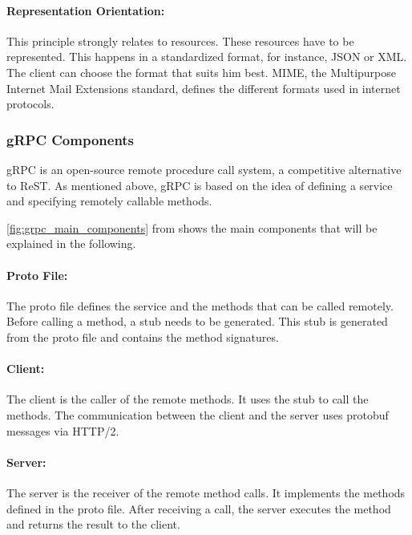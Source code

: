\paragraph*{Representation Orientation:}
This principle strongly relates to resources.
These resources have to be represented.
This happens in a standardized format, for instance, JSON or XML.
The client can choose the format that suits him best.
MIME, the Multipurpose Internet Mail Extensions standard, defines the different formats used in internet protocols.

\subsubsection*{gRPC Components}
gRPC is an open-source remote procedure call system, a competitive alternative to ReST.
As mentioned above, gRPC is based on the idea of defining a service and specifying remotely callable methods.

\autoref{fig:grpc_main_components} from \cite{CM-T-DES} shows the main components that will be explained in the following.

\paragraph*{Proto File:}
The proto file defines the service and the methods that can be called remotely.
Before calling a method, a stub needs to be generated.
This stub is generated from the proto file and contains the method signatures.

\paragraph*{Client:}
The client is the caller of the remote methods.
It uses the stub to call the methods.
The communication between the client and the server uses protobuf messages via HTTP/2.

\paragraph*{Server:}
The server is the receiver of the remote method calls.
It implements the methods defined in the proto file.
After receiving a call, the server executes the method and returns the result to the client.

